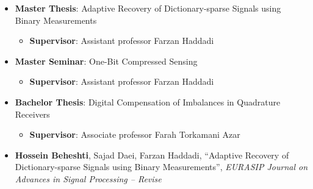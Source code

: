 

\begin{itemize}
	\item{
	            \textbf{Master Thesis}: Adaptive Recovery of Dictionary-sparse Signals using Binary Measurements
	            \begin{itemize}
		            \item \textbf{Supervisor}: Assistant professor Farzan Haddadi
	            \end{itemize}
	      }
	\item{
	            \textbf{Master Seminar}: One-Bit Compressed Sensing
	            \begin{itemize}
		            \item \textbf{Supervisor}: Assistant professor Farzan Haddadi
	            \end{itemize}
	      }
	\item{
	            \textbf{Bachelor Thesis}: Digital Compensation of Imbalances in Quadrature Receivers
	            \begin{itemize}
		            \item \textbf{Supervisor}: Associate professor Farah Torkamani Azar
	            \end{itemize}
	      }
	
	\item{
	            \textbf{Hossein Beheshti}, Sajad Daei, Farzan Haddadi, ``Adaptive Recovery of Dictionary-sparse Signals using Binary Measurements'',
	            \emph{EURASIP Journal on Advances in Signal Processing -- Revise}
	      }
	\\
\end{itemize}
